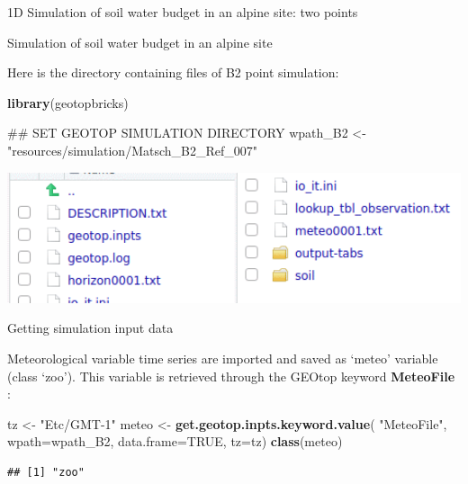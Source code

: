 \documentclass[ignorenonframetext,]{beamer}
\newenvironment{Shaded}{\begin{snugshade}}{\end{snugshade}}
\newcommand{\KeywordTok}[1]{\textcolor[rgb]{0.13,0.29,0.53}{\textbf{#1}}}
\newcommand{\DataTypeTok}[1]{\textcolor[rgb]{0.13,0.29,0.53}{#1}}
\newcommand{\StringTok}[1]{\textcolor[rgb]{0.31,0.60,0.02}{#1}}
\newcommand{\OtherTok}[1]{\textcolor[rgb]{0.56,0.35,0.01}{#1}}
\newcommand{\NormalTok}[1]{#1}
\begin{document}
\begin{frame}{1D Simulation of soil water budget in an alpine site: two
points}
\end{frame}

\begin{frame}[fragile]{Simulation of soil water budget in an alpine
site}

Here is the directory containing files of B2 point simulation:

\begin{Shaded}
\begin{Highlighting}[]
\KeywordTok{library}\NormalTok{(geotopbricks) }

\NormalTok{## SET GEOTOP SIMULATION DIRECTORY}
\NormalTok{wpath_B2 <-}\StringTok{ "resources/simulation/Matsch_B2_Ref_007"} 
\end{Highlighting}
\end{Shaded}

\includegraphics[width=1.00000\textwidth]{resources/images/geotop_folder_B2.png}\\

\end{frame}

\begin{frame}[fragile]{Getting simulation input data}

Meteorological variable time series are imported and saved as `meteo'
variable (class `zoo'). This variable is retrieved through the GEOtop
keyword \textbf{MeteoFile} :

\begin{Shaded}
\begin{Highlighting}[]
\NormalTok{tz <-}\StringTok{ "Etc/GMT-1"}
\NormalTok{meteo <-}\StringTok{ }\KeywordTok{get.geotop.inpts.keyword.value}\NormalTok{(}
  \StringTok{"MeteoFile"}\NormalTok{,}
  \DataTypeTok{wpath=}\NormalTok{wpath_B2,}
  \DataTypeTok{data.frame=}\OtherTok{TRUE}\NormalTok{,}
  \DataTypeTok{tz=}\NormalTok{tz)}
\KeywordTok{class}\NormalTok{(meteo)}
\end{Highlighting}
\end{Shaded}

\begin{verbatim}
## [1] "zoo"
\end{verbatim}

\end{frame}
\end{document}
